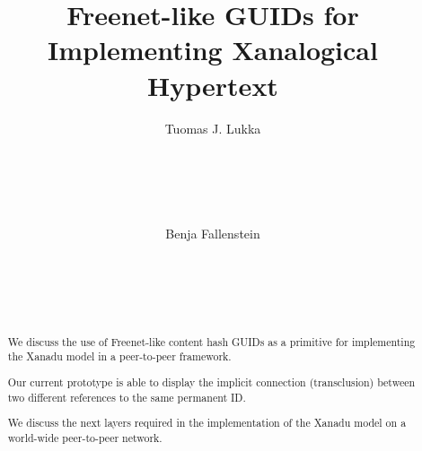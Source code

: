 \documentclass{sig-alternate}
\begin{document}
\newcommand{\url}[1]{\textsf{#1}}
\newcommand{\hyp}{\discretionary{}{}{}}


\title{
Freenet-like GUIDs for Implementing Xanalogical Hypertext
}


\author{
\alignauthor 
    Tuomas J. Lukka\\
    \\
    \\
    \\
    \\
    \\
\alignauthor
	 Benja Fallenstein\\
    \\
    \\
    \\
    \\
}

\maketitle


\begin{abstract}

We discuss the use of Freenet-like content hash GUIDs as a primitive
for implementing the Xanadu model in a peer-to-peer framework.

Our current prototype is able to display
the implicit connection (transclusion) between
two different references to the same permanent ID.

We discuss the next layers required in
the implementation
of the Xanadu model on
a world-wide peer-to-peer network.

\end{abstract}
\end{document}
